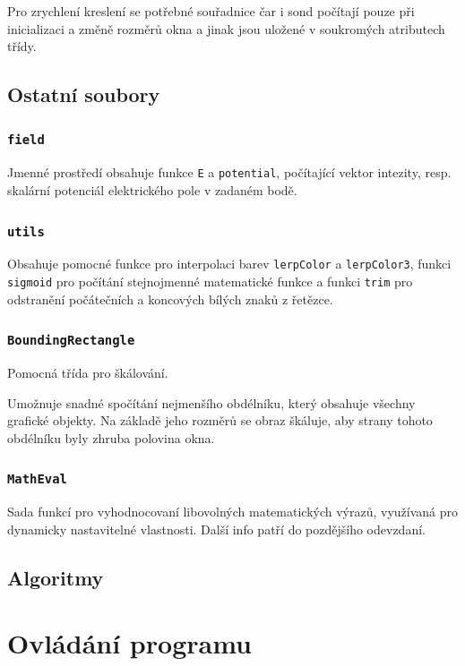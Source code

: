\documentclass[12pt,a4paper]{paper}
\newcommand{\code}[1]{\texttt{#1}}
\begin{document}
Pro zrychlení kreslení se potřebné souřadnice čar i sond počítají pouze při
inicializaci a změně rozměrů okna a jinak jsou uložené v soukromých atributech
třídy.

\subsection{Ostatní soubory}

\subsubsection{\code{field}}

Jmenné prostředí obsahuje funkce \code{E} a \code{potential}, počítající vektor
intezity, resp. skalární potenciál elektrického pole v zadaném bodě.

\subsubsection{\code{utils}}

Obsahuje pomocné funkce pro interpolaci barev \code{lerpColor} a \code{lerpColor3},
funkci \code{sigmoid} pro počítání stejnojmenné matematické funkce a funkci
\code{trim} pro odstranění počátečních a koncových bílých znaků z řetězce.

\subsubsection{\code{BoundingRectangle}}

Pomocná třída pro škálování.

Umožnuje snadné spočítání nejmenšího obdélníku, který obsahuje všechny grafické
objekty. Na základě jeho rozměrů se obraz škáluje, aby strany tohoto obdélníku 
byly zhruba polovina okna.

\subsubsection{\code{MathEval}}

Sada funkcí pro vyhodnocovaní libovolných matematických výrazů, využívaná pro
dynamicky nastavitelné vlastnosti. Další info patří do pozdějšího odevzdaní.

\subsection{Algoritmy}


\section{Ovládání programu}
\end{document}

